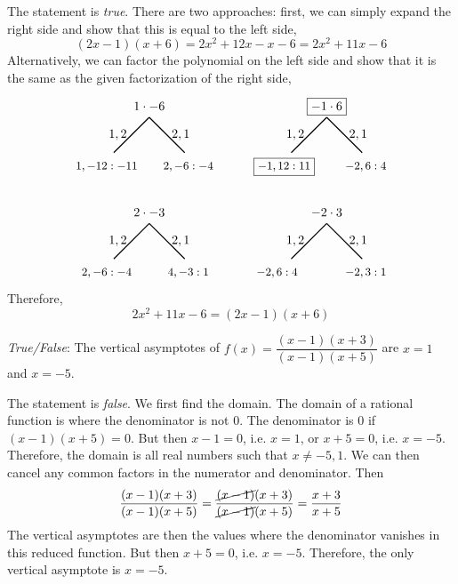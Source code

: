 \documentclass[11pt,letterpaper]{article}
\begin{document}
\sol The statement is \textit{true}. There are two approaches: first, we can simply expand the right side and show that this is equal to the left side, 
	\[
	(2x - 1)(x + 6)= 2x^2 + 12x - x - 6= 2x^2 + 11x - 6
	\]
Alternatively, we can factor the polynomial on the left side and show that it is the same as the given factorization of the right side, \pspace
	\[
	\begin{tikzpicture}
	\node at (0,0) {$1 \cdot -6$};
	\draw[line width=0.03cm] (0,-0.3) -- node[left] {$1, 2$} ++ (-1,-1);
	\draw[line width=0.03cm] (0,-0.3) -- node[right] {$2, 1$} ++ (1,-1);
	\node at (-1.2,-1.7) {\small$1, -12: -11$};
	\node at (1.1,-1.7) {\small$2, -6: -4$};
	
	\node at (5,0) {$\boxed{-1 \cdot 6}$};
	\draw[line width=0.03cm] (5,-0.3) -- node[left] {$1, 2$} ++ (-1,-1);
	\draw[line width=0.03cm] (5,-0.3) -- node[right] {$2, 1$} ++ (1,-1);
	\node at (3.8,-1.7) {\small$\boxed{-1, 12: 11}$};
	\node at (6.1,-1.7) {\small$-2, 6: 4$};
	
	\node at (0,-3) {$2 \cdot -3$};
	\draw[line width=0.03cm] (0,-3.3) -- node[left] {$1, 2$} ++ (-1,-1);
	\draw[line width=0.03cm] (0,-3.3) -- node[right] {$2, 1$} ++ (1,-1);
	\node at (-1.2,-4.7) {\small$2, -6: -4$};
	\node at (1.1,-4.7) {\small$4, -3: 1$};
	
	\node at (5,-3) {$-2 \cdot 3$};
	\draw[line width=0.03cm] (5,-3.3) -- node[left] {$1, 2$} ++ (-1,-1);
	\draw[line width=0.03cm] (5,-3.3) -- node[right] {$2, 1$} ++ (1,-1);
	\node at (3.6,-4.7) {\small$-2, 6: 4$};
	\node at (6.1,-4.7) {\small$-2, 3: 1$};
	\end{tikzpicture}
	\]	
Therefore,
	\[
	2x^2 + 11x - 6= (2x - 1)(x + 6)
	\] \pvspace{1.3cm}



\quizsol \textit{True/False}: The vertical asymptotes of $f(x)= \dfrac{(x - 1)(x + 3)}{(x - 1)(x + 5)}$ are $x= 1$ and $x= -5$. \pspace

\sol The statement is \textit{false}. We first find the domain. The domain of a rational function is where the denominator is not 0. The denominator is 0 if $(x - 1)(x + 5)= 0$. But then $x - 1= 0$, i.e. $x= 1$, or $x + 5= 0$, i.e. $x= -5$. Therefore, the domain is all real numbers such that $x \neq -5, 1$. We can then cancel any common factors in the numerator and denominator. Then
	\[
	\dfrac{(x - 1)(x + 3)}{(x - 1)(x + 5)}= \dfrac{\cancel{(x - 1)}(x + 3)}{\cancel{(x - 1)}(x + 5)}= \dfrac{x + 3}{x + 5}
	\]
The vertical asymptotes are then the values where the denominator vanishes in this reduced function. But then $x + 5= 0$, i.e. $x= -5$. Therefore, the only vertical asymptote is $x= -5$. \pvspace{1.5cm}
\end{document}
